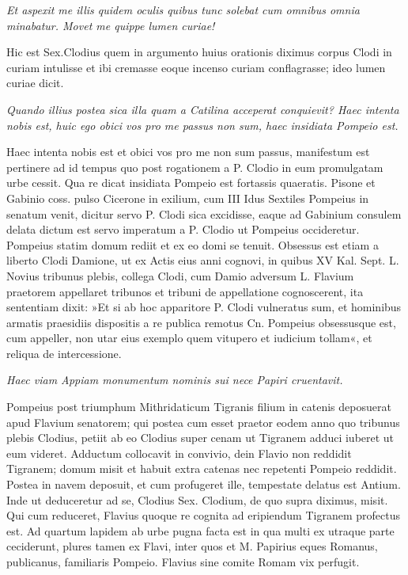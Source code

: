 \textit{Et aspexit me illis quidem oculis quibus tunc solebat cum omnibus omnia minabatur. Movet me quippe lumen curiae!}

Hic est Sex.Clodius quem in argumento huius orationis diximus corpus Clodi in curiam intulisse et ibi cremasse eoque incenso curiam conflagrasse; ideo lumen curiae dicit.

\textit{Quando illius postea sica illa quam a Catilina acceperat conquievit? Haec intenta nobis est, huic ego obici vos pro me passus non sum, haec insidiata Pompeio est.}

Haec intenta nobis est et obici vos pro me non sum passus, manifestum est pertinere ad id tempus quo post rogationem a P. Clodio in eum promulgatam urbe cessit. Qua re dicat insidiata Pompeio est fortassis quaeratis. Pisone et Gabinio coss. pulso Cicerone in exilium, cum III Idus Sextiles Pompeius in senatum venit, dicitur servo P. Clodi sica excidisse, eaque ad Gabinium consulem delata dictum est servo imperatum a P. Clodio ut Pompeius occideretur. Pompeius statim domum rediit et ex eo domi se tenuit. Obsessus est etiam a liberto Clodi Damione, ut ex Actis eius anni cognovi, in quibus XV Kal. Sept. L. Novius tribunus plebis, collega Clodi, cum Damio adversum L. Flavium praetorem appellaret tribunos et tribuni de appellatione cognoscerent, ita sententiam dixit: »Et si ab hoc apparitore P. Clodi vulneratus sum, et hominibus armatis praesidiis dispositis a re publica remotus Cn. Pompeius obsessusque est, cum appeller, non utar eius exemplo quem vitupero et iudicium tollam«, et reliqua de intercessione.

\textit{Haec viam Appiam monumentum nominis sui nece Papiri cruentavit.}

Pompeius post triumphum Mithridaticum Tigranis filium in catenis deposuerat apud Flavium senatorem; qui postea cum esset praetor eodem anno quo tribunus plebis Clodius, petiit ab eo Clodius super cenam ut Tigranem adduci iuberet ut eum videret. Adductum collocavit in convivio, dein Flavio non reddidit Tigranem; domum misit et habuit extra catenas nec repetenti Pompeio reddidit. Postea in navem deposuit, et cum profugeret ille, tempestate delatus est Antium. Inde ut deduceretur ad se, Clodius Sex. Clodium, de quo supra diximus, misit. Qui cum reduceret, Flavius quoque re cognita ad eripiendum Tigranem profectus est. Ad quartum lapidem ab urbe pugna facta est in qua multi ex utraque parte ceciderunt, plures tamen ex Flavi, inter quos et M. Papirius eques Romanus, publicanus, familiaris Pompeio. Flavius sine comite Romam vix perfugit.

